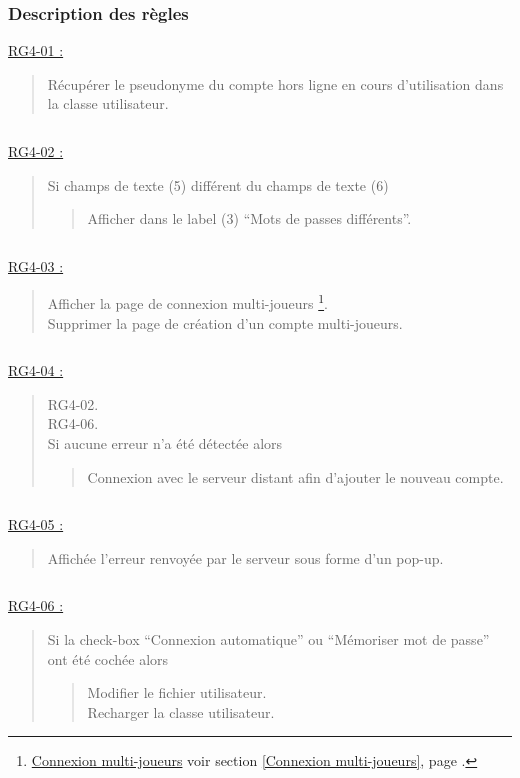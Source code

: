 \documentclass{report}
\begin{document}
		\subsubsection{Description des règles}

			\underline{RG4-01 :}
				\begin{quote}
					Récupérer le pseudonyme du compte hors ligne en cours d'utilisation dans la classe utilisateur.
				\end{quote}

			$\,$

			\underline{RG4-02 :}
				\begin{quote}
					Si champs de texte (5) différent du champs de texte (6)
					\begin{quote}
						Afficher dans le label (3) ``Mots de passes différents''.
					\end{quote}
				\end{quote}

			$\,$				
				
			\underline{RG4-03 :}
				\begin{quote}
					Afficher la page de connexion multi-joueurs%
						\footnote[1]{
							\hyperlink{Connexion multi-joueurs}{Connexion multi-joueurs}
							\og voir section \ref{Connexion multi-joueurs}, page \pageref{Connexion multi-joueurs}.\fg
						}.\\
					Supprimer la page de création d'un compte multi-joueurs.
				\end{quote}
				
			$\,$

			\underline{RG4-04 :}
				\begin{quote}
					RG4-02.\\
					RG4-06.\\
					Si aucune erreur n'a été détectée alors
						\begin{quote}
							Connexion avec le serveur distant afin d'ajouter le nouveau compte.
						\end{quote}
				\end{quote}
				
			$\,$
				
			\underline{RG4-05 :}
				\begin{quote}
					Affichée l'erreur renvoyée par le serveur sous forme d'un pop-up.
				\end{quote}

			$\,$
			
			\underline{RG4-06 :}
				\begin{quote}
					Si la check-box ``Connexion automatique'' ou ``Mémoriser mot de passe'' ont été cochée alors
					\begin{quote}
						Modifier le fichier utilisateur.\\
						Recharger la classe utilisateur.
					\end{quote}
				\end{quote}			
	
\end{document}
